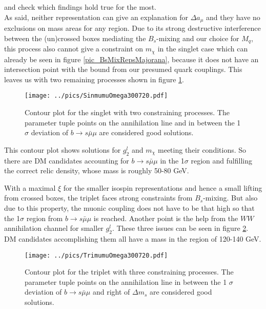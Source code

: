 and check which findings hold true for the most. \\
\noindent As said, neither representation can give an explanation for $\Delta a_\mu$ and they have no exclusions on mass areas for any region. 
Due to its strong destructive interference between the (un)crossed boxes mediating the $B_s$-mixing and our choice for $M_q$, this process 
also cannot give a constraint on $m_\chi$ in the singlet case which can already be seen in figure \ref{pic_BsMixRepsMajorana}, because it does 
not have an intersection point with the bound from our presumed quark couplings. This leaves us with two remaining processes shown in figure 
\ref{pic_SinRes}. 
\begin{figure}[t]
 \texttt{[image: ../pics/SinmumuOmega300720.pdf]}
 \caption{Contour plot for the singlet with two constraining processes. The parameter tuple points on the annihilation line and in between the 
 1 $\sigma$ deviation of $b\rightarrow s\bar\mu\mu$ are considered good solutions. }
 \label{pic_SinRes}
\end{figure}
This contour plot shows solutions for $g_2^l$ and $m_\chi$ meeting their conditions. So there are DM candidates accounting for  
$b\rightarrow s\bar\mu\mu$ in the 1$\sigma$ region and fulfilling the correct relic density, whose mass is roughly 50-80 GeV.

\noindent With a maximal $\xi$ for the smaller isospin representations and hence a small lifting from crossed boxes, the triplet faces strong
constraints from $B_s$-mixing. But also due to this property, the muonic coupling does not have to be that high so that the 1$\sigma$ region from
$b\rightarrow s\bar\mu\mu$ is reached. Another point is the help from the $WW$ annihilation channel for smaller $g_2^l$. These three issues can be
seen in figure \ref{pic_TriRes}. DM candidates accomplishing them all have a mass in the region of 120-140 GeV.
\begin{figure}[t]
 \texttt{[image: ../pics/TrimumuOmega300720.pdf]}
 \caption{Contour plot for the triplet with three constraining processes. The parameter tuple points on the annihilation line in between the 
 1 $\sigma$ deviation of $b\rightarrow s\bar\mu\mu$ and right of $\Delta m_s$ are considered good solutions. }
 \label{pic_TriRes}
\end{figure}




% 
% 





